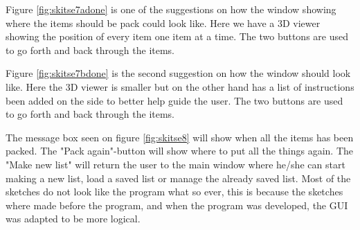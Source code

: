 Figure \ref{fig:skitse7adone} is one of the suggestions on how the window showing where the items should be pack could look like. Here we have a 3D viewer showing the position of every item one item at a time. The two buttons are used to go forth and back through the items.


Figure \ref{fig:skitse7bdone} is the second suggestion on how the window should look like. Here the 3D viewer is smaller but on the other hand has a list of instructions been added on the side to better help guide the user. The two buttons are used to go forth and back through the items.


The message box seen on figure \ref{fig:skitse8} will show when all the items has been packed. The "Pack again"-button will show where to put all the things again. The "Make new list" will return the user to the main window where he/she can start making a new list, load a saved list or manage the already saved list. Most of the sketches do not look like the program what so ever, this is because the sketches where made before the program, and when the program was developed, the GUI was adapted to be more logical.
